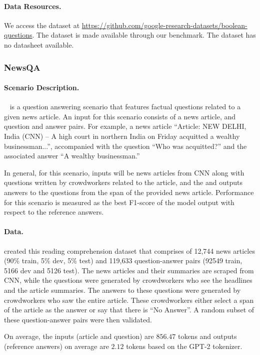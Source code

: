 \paragraph{Data Resources.}
We access the dataset at \url{https://github.com/google-research-datasets/boolean-questions}.
The dataset is made available through our benchmark.
The dataset has no datasheet available. 

\subsubsection{NewsQA}
\paragraph{Scenario Description.}
\newsqa~\citep{trischler2017newsqa} is a question answering scenario that features factual questions related to a given news article. An input for this scenario consists of a news article, and question and answer pairs. For example, a news article ``Article: NEW DELHI, India (CNN) -- A high court in northern India on Friday acquitted a wealthy businessman...'', accompanied with the question ``Who was acquitted?'' and the associated answer ``A wealthy businessman.''

In general, for this scenario, inputs will be news articles from CNN along with questions written by crowdworkers related to the article, and the and outputs answers to the questions from the span of the provided news article.
Performance for this scenario is measured as the best F1-score of the model output with respect to the reference answers. 

\paragraph{Data.}
\citet{trischler2017newsqa} created this reading comprehension dataset that comprises of  12,744 news articles (90\% train, 5\% dev, 5\% test) and 119,633 question-answer pairs (92549 train, 5166 dev and 5126 test). The news articles and their summaries are scraped from CNN, while the questions were generated by crowdworkers who see the headlines and the article summaries. The answers to these questions were generated by crowdworkers who saw the entire article. These crowdworkers either select a span of the article as the answer or say that there is ``No Answer''. A random subset of these question-answer pairs were then validated.

On average, the inputs (article and question) are $856.47$ tokens and outputs (reference answers) on average are $2.12$ tokens based on the GPT-2 tokenizer.

